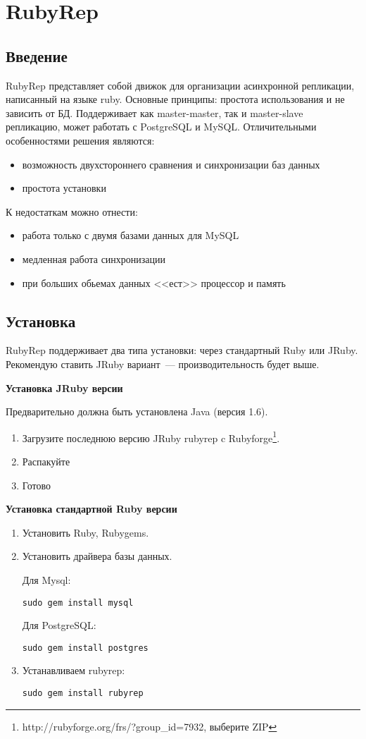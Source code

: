 \section{RubyRep}
\subsection{Введение}
RubyRep представляет собой движок для организации асинхронной репликации, написанный на языке ruby. 
Основные принципы: простота использования и не зависить от БД. 
Поддерживает как master-master, так и master-slave репликацию, может работать с PostgreSQL и MySQL.
Отличительными особенностями решения являются:
\begin{itemize}
\item возможность двухстороннего сравнения и синхронизации баз данных
\item простота установки
\end{itemize}
К недостаткам можно отнести:
\begin{itemize}
\item работа только с двумя базами данных для MySQL
\item медленная работа синхронизации 
\item при больших обьемах данных <<ест>> процессор и память
\end{itemize}


\subsection{Установка}
RubyRep поддерживает два типа установки: через стандартный Ruby или JRuby. 
Рекомендую ставить JRuby вариант~--- производительность будет выше.

\textbf{Установка JRuby версии}

Предварительно должна быть установлена Java (версия 1.6).
\begin{enumerate}
 \item Загрузите последнюю версию JRuby rubyrep c Rubyforge\footnote{http://rubyforge.org/frs/?group\_id=7932, выберите ZIP}.
 \item Распакуйте
 \item Готово
\end{enumerate}

\textbf{Установка стандартной Ruby версии}
\begin{enumerate}
\item Установить Ruby, Rubygems.
\item Установить драйвера базы данных.

Для Mysql: 
\begin{verbatim}
sudo gem install mysql
\end{verbatim}

Для PostgreSQL:
\begin{verbatim}
sudo gem install postgres
\end{verbatim}

\item Устанавливаем rubyrep:
\begin{verbatim}
sudo gem install rubyrep
\end{verbatim}
\end{enumerate}



